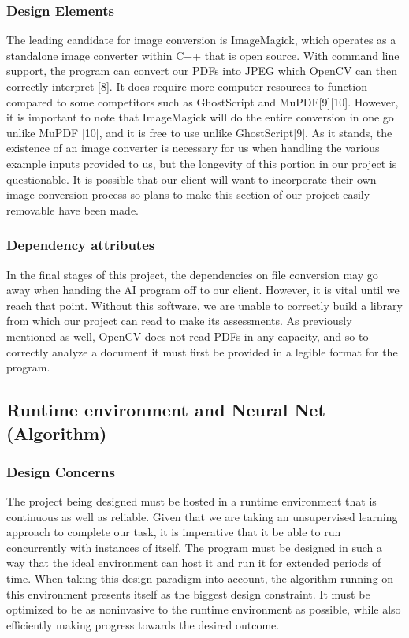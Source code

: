 \documentclass[onecolumn, draftclsnofoot,10pt, compsoc]{IEEEtran}
\begin{document}
\subsubsection{Design Elements}
The leading candidate for image conversion is ImageMagick, which operates as a standalone image converter within C++ that is open source. With command line support, the program can convert our PDFs into JPEG which OpenCV can then correctly interpret [8]. It does require more computer resources to function compared to some competitors such as GhostScript and MuPDF[9][10]. However, it is important to note that ImageMagick will do the entire conversion in one go unlike MuPDF [10], and it is free to use unlike GhostScript[9]. As it stands, the existence of an image converter is necessary for us when handling the various example inputs provided to us, but the longevity of this portion in our project is questionable. It is possible that our client will want to incorporate their own image conversion process so plans to make this section of our project easily removable have been made.

\subsubsection{Dependency attributes}
In the final stages of this project, the dependencies on file conversion may go away when handing the AI program off to our client. However, it is vital until we reach that point. Without this software, we are unable to correctly build a library from which our project can read to make its assessments. As previously mentioned as well, OpenCV does not read PDFs in any capacity, and so to correctly analyze a document it must first be provided in a legible format for the program.

\subsection{Runtime environment and Neural Net (Algorithm)}
\subsubsection{Design Concerns}
	The project being designed must be hosted in a runtime environment that is continuous as well as reliable. Given that we are taking an unsupervised learning approach to complete our task, it is imperative that it be able to run concurrently with instances of itself. The program must be designed in such a way that the ideal environment can host it and run it for extended periods of time. When taking this design paradigm into account, the algorithm running on this environment presents itself as the biggest design constraint. It must be optimized to be as noninvasive to the runtime environment as possible, while also efficiently making progress towards the desired outcome. 
\end{document}
